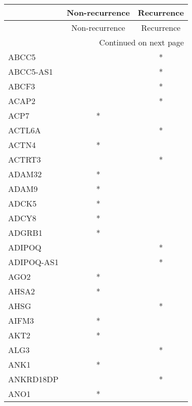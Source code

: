 \begin{longtable}{lcc}
\toprule
{} & Non-recurrence & Recurrence \\
\midrule
\endfirsthead

\toprule
{} & Non-recurrence & Recurrence \\
\midrule
\endhead
\midrule
\multicolumn{3}{r}{{Continued on next page}} \\
\midrule
\endfoot

\bottomrule
\endlastfoot
ABCC5            &                &          * \\
ABCC5-AS1        &                &          * \\
ABCF3            &                &          * \\
ACAP2            &                &          * \\
ACP7             &              * &            \\
ACTL6A           &                &          * \\
ACTN4            &              * &            \\
ACTRT3           &                &          * \\
ADAM32           &              * &            \\
ADAM9            &              * &            \\
ADCK5            &              * &            \\
ADCY8            &              * &            \\
ADGRB1           &              * &            \\
ADIPOQ           &                &          * \\
ADIPOQ-AS1       &                &          * \\
AGO2             &              * &            \\
AHSA2            &              * &            \\
AHSG             &                &          * \\
AIFM3            &              * &            \\
AKT2             &              * &            \\
ALG3             &                &          * \\
ANK1             &              * &            \\
ANKRD18DP        &                &          * \\
ANO1             &              * &            \\

\end{longtable}
